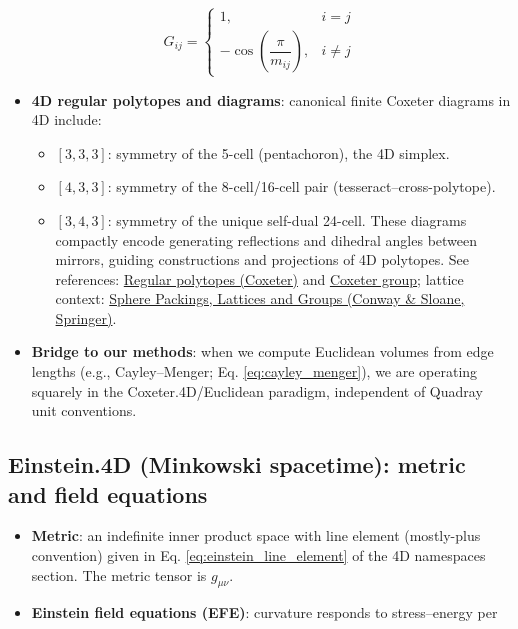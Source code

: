 \documentclass[
  10pt,
]{article}
\providecommand{\tightlist}{%
  \setlength{\itemsep}{0pt}\setlength{\parskip}{0pt}}
\begin{document}
\begin{equation}\label{eq:coxeter_gram}
G_{ij} = \begin{cases}
1, & i=j \\
-\cos\!\left(\dfrac{\pi}{m_{ij}}\right), & i\ne j
\end{cases}
\end{equation}

\begin{itemize}
\tightlist
\item
  \textbf{4D regular polytopes and diagrams}: canonical finite Coxeter
  diagrams in 4D include:

  \begin{itemize}
  \tightlist
  \item
    \([3,3,3]\): symmetry of the 5-cell (pentachoron), the 4D simplex.
  \item
    \([4,3,3]\): symmetry of the 8-cell/16-cell pair
    (tesseract--cross-polytope).
  \item
    \([3,4,3]\): symmetry of the unique self-dual 24-cell. These
    diagrams compactly encode generating reflections and dihedral angles
    between mirrors, guiding constructions and projections of 4D
    polytopes. See references:
    \href{https://en.wikipedia.org/wiki/Regular_polytope}{Regular
    polytopes (Coxeter)} and
    \href{https://en.wikipedia.org/wiki/Coxeter_group}{Coxeter group};
    lattice context:
    \href{https://link.springer.com/book/10.1007/978-1-4757-6568-7}{Sphere
    Packings, Lattices and Groups (Conway \& Sloane, Springer)}.
  \end{itemize}
\item
  \textbf{Bridge to our methods}: when we compute Euclidean volumes from
  edge lengths (e.g., Cayley--Menger; Eq. \eqref{eq:cayley_menger}), we
  are operating squarely in the Coxeter.4D/Euclidean paradigm,
  independent of Quadray unit conventions.
\end{itemize}

\hypertarget{einstein.4d-minkowski-spacetime-metric-and-field-equations}{%
\subsection{Einstein.4D (Minkowski spacetime): metric and field
equations}\label{einstein.4d-minkowski-spacetime-metric-and-field-equations}}

\begin{itemize}
\tightlist
\item
  \textbf{Metric}: an indefinite inner product space with line element
  (mostly-plus convention) given in Eq. \eqref{eq:einstein_line_element}
  of the 4D namespaces section. The metric tensor is \(g_{\mu\nu}\).
\item
  \textbf{Einstein field equations (EFE)}: curvature responds to
  stress--energy per
\end{itemize}
\end{document}
